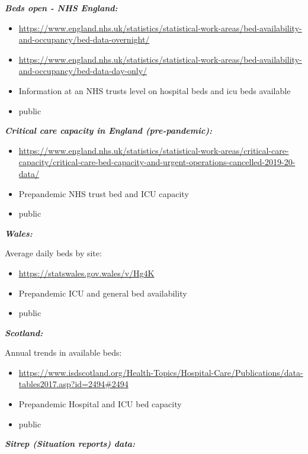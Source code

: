 \documentclass[
]{article}
\providecommand{\tightlist}{%
  \setlength{\itemsep}{0pt}\setlength{\parskip}{0pt}}
\begin{document}
\textbf{\emph{Beds open - NHS England:}}

\begin{itemize}
\tightlist
\item
  \url{https://www.england.nhs.uk/statistics/statistical-work-areas/bed-availability-and-occupancy/bed-data-overnight/}
\item
  \url{https://www.england.nhs.uk/statistics/statistical-work-areas/bed-availability-and-occupancy/bed-data-day-only/}
\item
  Information at an NHS trusts level on hospital beds and icu beds
  available
\item
  public
\end{itemize}

\textbf{\emph{Critical care capacity in England (pre-pandemic):}}

\begin{itemize}
\tightlist
\item
  \url{https://www.england.nhs.uk/statistics/statistical-work-areas/critical-care-capacity/critical-care-bed-capacity-and-urgent-operations-cancelled-2019-20-data/}
\item
  Prepandemic NHS trust bed and ICU capacity
\item
  public
\end{itemize}

\textbf{\emph{Wales:}}

Average daily beds by site:

\begin{itemize}
\tightlist
\item
  \url{https://statswales.gov.wales/v/Hg4K}
\item
  Prepandemic ICU and general bed availability
\item
  public
\end{itemize}

\textbf{\emph{Scotland:}}

Annual trends in available beds:

\begin{itemize}
\tightlist
\item
  \url{https://www.isdscotland.org/Health-Topics/Hospital-Care/Publications/data-tables2017.asp?id=2494\#2494}
\item
  Prepandemic Hospital and ICU bed capacity
\item
  public
\end{itemize}

\textbf{\emph{Sitrep (Situation reports) data:}}
\end{document}
